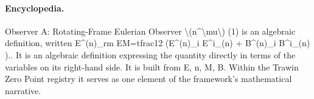 \paragraph{Encyclopedia.}
Observer A: Rotating-Frame Eulerian Observer \textbackslash{}(n\textasciicircum{}\textbackslash{}mu\textbackslash{}) (1) is an algebraic definition, written E\textasciicircum{}(n)\_rm EM=tfrac12 (E\textasciicircum{}(n)\_i E\textasciicircum{}i\_(n) + B\textasciicircum{}(n)\_i B\textasciicircum{}i\_(n) ).. It is an algebraic definition expressing the quantity directly in terms of the variables on its right-hand side. It is built from E, n, M, B. Within the Trawin Zero Point registry it serves as one element of the framework's mathematical narrative.
